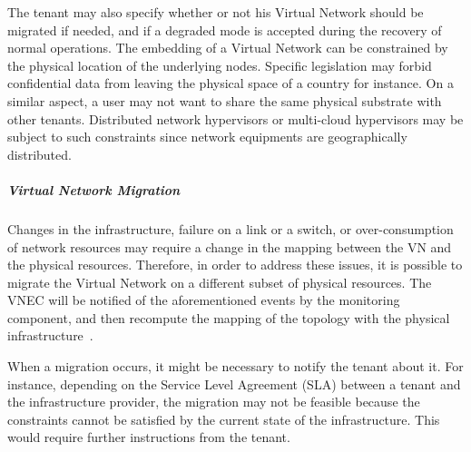 The tenant may also specify whether or not his Virtual Network should be migrated if needed, and if a degraded mode is accepted during the recovery of normal operations.
The embedding of a Virtual Network can be constrained by the physical location of the underlying nodes.
Specific legislation may forbid confidential data from leaving the physical space of a country for instance.
On a similar aspect, a user may not want to share the same physical substrate with other tenants.
Distributed network hypervisors or multi-cloud hypervisors may be subject to such constraints since network equipments are geographically distributed.



\subparagraph{Virtual Network Migration}
Changes in the infrastructure, failure on a link or a switch, or over-consumption of network resources may require a change in the mapping between the VN and the physical resources.
Therefore, in order to address these issues, it is possible to migrate the Virtual Network on a different subset of physical resources. 
The VNEC will be notified of the aforementioned events by the monitoring component, and then recompute the mapping of the topology with the physical infrastructure~\cite{VeRTIGO-Corin2012a,AutoSlice-Bozakov2012,CoVisor-Jin2015}.

When a migration occurs, it might be necessary to notify the tenant about it.
For instance, depending on the Service Level Agreement (SLA) between a tenant and the infrastructure provider, the migration may not be feasible because the constraints cannot be satisfied by the current state of the infrastructure. This would require further instructions from the tenant.


